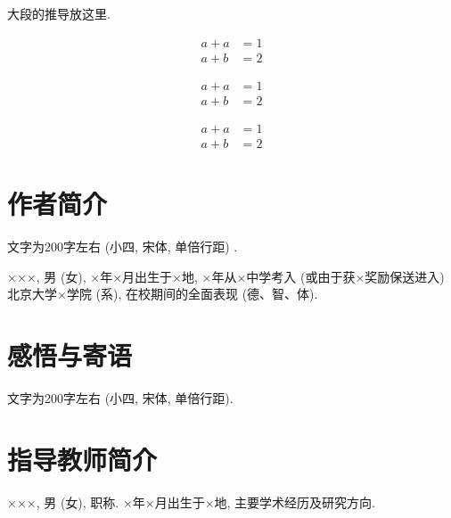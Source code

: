\documentclass{urtemp}
\begin{document}
大段的推导放这里.

$$
\begin{aligned}
    a+a&=1\\
    a+b&=2
\end{aligned}
$$

\begin{equation}
\begin{aligned}
    a+a&=1\\
    a+b&=2
\end{aligned}\label{eqA1}
\end{equation}

\begin{subequations}
    \begin{align}
        a+a&=1\label{eqA2}\\
        a+b&=2\label{eqA3}
    \end{align}
\end{subequations}
    

\section*{作者简介}

文字为200字左右 (小四, 宋体, 单倍行距) .

×××, 男 (女), ×年×月出生于×地, ×年从×中学考入 (或由于获×奖励保送进入) 北京大学×学院 (系), 在校期间的全面表现 (德、智、体).

\section*{感悟与寄语}

文字为200字左右 (小四, 宋体, 单倍行距).

\section*{指导教师简介}

×××, 男 (女), 职称. ×年×月出生于×地, 主要学术经历及研究方向.
\end{document}
